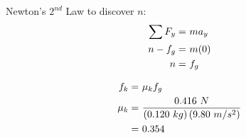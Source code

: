 		Newton's $2^{nd}$ Law to discover $n$:
		\begin{align}
			\sum F_{y} = \ &ma_{y}& \notag \\
			n - f_{g} = \ &m(0)& \notag \\
			n = \ &f_{g}& \notag
		\end{align}

		\begin{align}
			f_{k} = \ &\mu_{k}f_{g}& \notag \\
			\mu_{k} = \ &\frac{0.416 \ N}{(0.120 \ kg)\left( 9.80 \ m/s^{2} \right)}& \notag \\
			= \ &0.354&
		\end{align}

